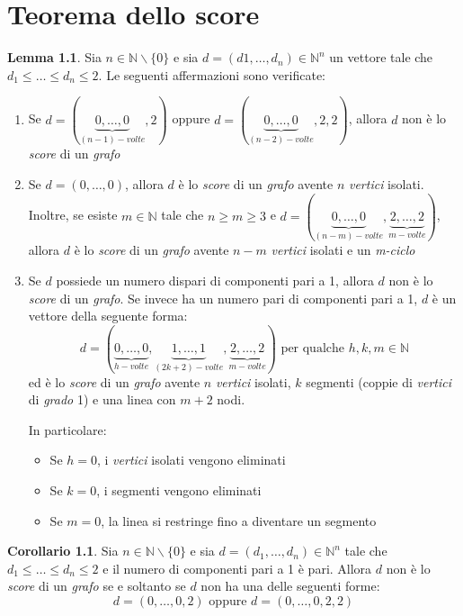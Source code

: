 \documentclass[12pt, a4paper]{report}
\newcommand{\N}{\mathbb{N}}
\theoremstyle{definition}
\newtheorem{corollary}{Corollario}[section]
\newtheorem{lemma}{Lemma}[section]
\begin{document}
\chapter{Teorema dello score}
\begin{lemma}
    Sia $n\in\N\backslash\{0\}$ e sia $d=(d1,\dots,d_n)\in\N^n$ un vettore tale
    che $d_1\leq\dots\leq d_n\leq 2$. Le seguenti affermazioni sono verificate:
    \begin{enumerate}[label=(\roman*)]
        \item Se $d=(\underbrace{0,\dots,0}_{(n-1)-volte},2)$ oppure $d=(
        \underbrace{0,\dots,0}_{(n-2)-volte},2,2)$, allora $d$ non è lo
        \emph{score} di un \emph{grafo}
        \item Se $d=(0,\dots,0)$, allora $d$ è lo \emph{score} di un \emph{grafo}
        avente $n$ \emph{vertici} isolati. Inoltre, se esiste $m\in\N$ tale che
        $n\geq m\geq 3$ e $d=(\underbrace{0,\dots,0}_{(n-m)-volte},
        \underbrace{2,\dots,2}_{m-volte})$, allora $d$ è lo \emph{score} di un
        \emph{grafo} avente $n-m$ \emph{vertici} isolati e un \emph{m-ciclo}
        \item Se $d$ possiede un numero dispari di componenti pari a 1, allora $d$
        non è lo \emph{score} di un \emph{grafo}. Se invece ha un numero pari di
        componenti pari a 1, $d$ è un vettore della seguente forma:
        \[d=(\underbrace{0,\dots,0}_{h-volte}, \underbrace{1,\dots,1}_{(2k+2)-volte},
        \underbrace{2,\dots,2}_{m-volte}) \text{ per qualche } h,k,m\in\N\]
        ed è lo \emph{score} di un \emph{grafo} avente $n$ \emph{vertici} isolati,
        $k$ segmenti (coppie di \emph{vertici} di \emph{grado} 1) e una linea con
        $m+2$ nodi.

        In particolare:
        \begin{itemize}
            \item Se $h=0$, i \emph{vertici} isolati vengono eliminati
            \item Se $k=0$, i segmenti vengono eliminati
            \item Se $m=0$, la linea si restringe fino a diventare un segmento
        \end{itemize}
    \end{enumerate}
\end{lemma}

\begin{corollary}
    Sia $n\in\N\backslash\{0\}$ e sia $d=(d_1,\dots,d_n)\in\N^n$ tale che $d_1\leq
    \dots\leq d_n\leq 2$ e il numero di componenti pari a 1 è pari. Allora $d$
    non è lo \emph{score} di un \emph{grafo} se e soltanto se $d$ non ha una delle
    seguenti forme:
    \[d=(0,\dots,0,2)\text{ oppure }d=(0,\dots,0,2,2)\]
\end{corollary}
\end{document}
